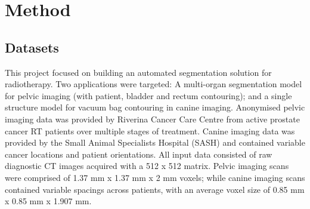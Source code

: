 \chapter{Method}
\label{ch:method}

\section{Datasets}
\label{ch:method-dataset}
This project focused on building an automated segmentation solution for radiotherapy. Two applications were targeted: A multi-organ segmentation model for pelvic imaging (with patient, bladder and rectum contouring); and a single structure model for vacuum bag contouring in canine imaging. Anonymised pelvic imaging data was provided by Riverina Cancer Care Centre from active prostate cancer RT patients over multiple stages of treatment. Canine imaging data was provided by the Small Animal Specialists Hospital (SASH) and contained variable cancer locations and patient orientations. All input data consisted of raw diagnostic CT images acquired with a 512 x 512 matrix. Pelvic imaging scans were comprised of 1.37 mm x 1.37 mm x 2 mm voxels; while canine imaging scans contained variable spacings across patients, with an average voxel size of 0.85 mm x 0.85 mm x 1.907 mm.

